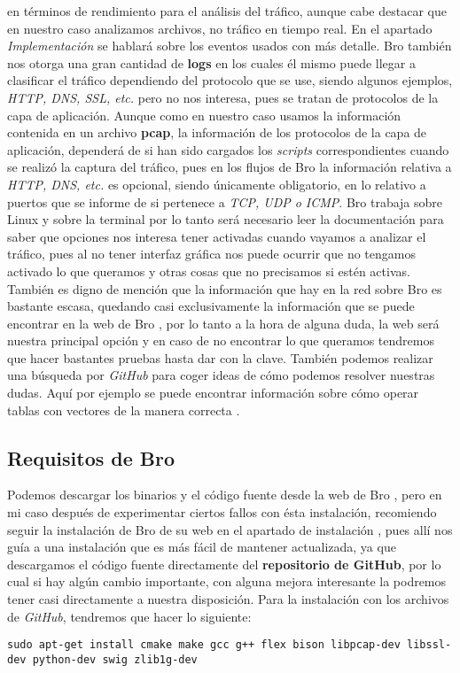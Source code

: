 en términos de rendimiento para el análisis del tráfico, aunque cabe 
destacar que en nuestro caso analizamos archivos, no tráfico en tiempo real. 
En el apartado \textit{Implementación} se hablará sobre los eventos usados con más detalle.
\intro
Bro también nos otorga una gran cantidad de \textbf{logs} en los cuales él mismo puede 
llegar a clasificar el tráfico dependiendo del protocolo que se use, siendo 
algunos ejemplos, \textit{HTTP, DNS, SSL, etc.} pero no nos interesa, pues se tratan de protocolos 
de la capa de aplicación. Aunque como en nuestro caso usamos la información contenida en 
un archivo \textbf{pcap}, la información de los protocolos de la capa de aplicación, 
dependerá de si han sido cargados los \textit{scripts} correspondientes cuando se 
realizó la captura del tráfico, pues en los flujos 
de Bro la información relativa a \textit{HTTP, DNS, etc.} es opcional, siendo únicamente 
obligatorio, en lo relativo a puertos que se informe de si pertenece a \textit{TCP, UDP o ICMP}.
\intro
Bro trabaja sobre Linux y sobre la terminal por lo tanto será necesario leer 
la documentación para saber que opciones nos interesa tener activadas cuando 
vayamos a analizar el tráfico, pues al no tener interfaz gráfica nos puede 
ocurrir que no tengamos activado lo que queramos y otras cosas que no 
precisamos si estén activas.
\intro
También es digno de mención que la información que hay en la red sobre Bro 
es bastante escasa, quedando casi exclusivamente la información que se puede 
encontrar en la web de Bro \cite{broindex}, por lo tanto a la hora de alguna 
duda, la web será nuestra principal opción y en caso de no encontrar lo que 
queramos tendremos que hacer bastantes pruebas hasta dar con la clave. 
También podemos realizar una búsqueda por \textit{GitHub} para coger ideas de cómo 
podemos resolver nuestras dudas. Aquí por ejemplo se puede encontrar información 
sobre cómo operar tablas con vectores de la manera correcta \cite{gitbeacon}.

\subsection{Requisitos de Bro}

Podemos descargar los binarios y el código fuente desde la web de Bro \cite{brodownload}, 
pero en mi caso después de experimentar ciertos fallos con ésta instalación, 
recomiendo seguir la instalación de Bro de su web en el apartado de instalación \cite{broinstall}, 
pues allí nos guía a una instalación que es más fácil de mantener actualizada, 
ya que descargamos el código fuente directamente del \textbf{repositorio de GitHub}, 
por lo cual si hay algún cambio importante, con alguna mejora interesante 
la podremos tener casi directamente a nuestra disposición.
\intro
Para la instalación con los archivos de \textit{GitHub}, tendremos que hacer lo siguiente:
\intro
\begin{lstlisting}[style=Consola]
sudo apt-get install cmake make gcc g++ flex bison libpcap-dev libssl-dev python-dev swig zlib1g-dev
\end{lstlisting}


